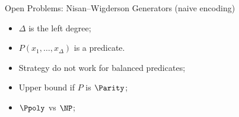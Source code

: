 \begin{frame}{Open Problems: Nisan--Wigderson Generators (naive encoding)}

    \begin{minipage}{0.48\linewidth}
        \centering
        
    \end{minipage}
    \begin{minipage}{0.48\linewidth}
        \begin{itemize}
            \item $\Delta$ is the left degree;
            \item $P(x_1, \dots, x_{\Delta})$ is a predicate.
        \end{itemize}
        
        \vspace{0.2cm}
        \pause
        \begin{itemize}
            \item Strategy do not work for balanced predicates;
            \item Upper bound if $P$ is $\Parity$;
            \item $\Ppoly$ vs $\NP$;
        \end{itemize}
    \end{minipage}
\end{frame}


